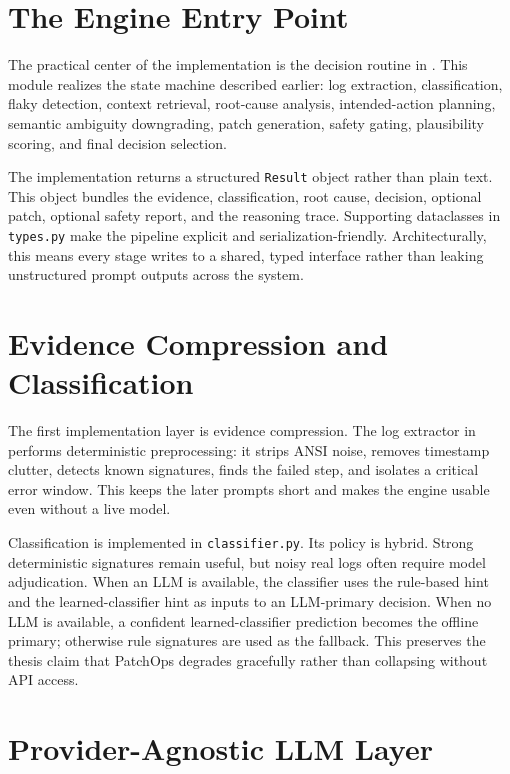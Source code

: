 \section{The Engine Entry Point}

The practical center of the implementation is the decision routine in . This
module realizes the state machine described earlier: log extraction, classification, flaky detection, context
retrieval, root-cause analysis, intended-action planning, semantic ambiguity downgrading, patch generation,
safety gating, plausibility scoring, and final decision selection.

The implementation returns a structured \texttt{Result} object rather than plain text. This object bundles the
evidence, classification, root cause, decision, optional patch, optional safety report, and the reasoning
trace. Supporting dataclasses in \texttt{types.py} make the pipeline explicit and serialization-friendly.
Architecturally, this means every stage writes to a shared, typed interface rather than leaking unstructured
prompt outputs across the system.

\section{Evidence Compression and Classification}

The first implementation layer is evidence compression. The log extractor in
 performs deterministic preprocessing: it strips ANSI noise, removes
timestamp clutter, detects known signatures, finds the failed step, and isolates a critical error window. This
keeps the later prompts short and makes the engine usable even without a live model.

Classification is implemented in \texttt{classifier.py}. Its policy is hybrid. Strong deterministic signatures
remain useful, but noisy real logs often require model adjudication. When an LLM is available, the classifier
uses the rule-based hint and the learned-classifier hint as inputs to an LLM-primary decision. When no LLM is
available, a confident learned-classifier prediction becomes the offline primary; otherwise rule signatures are
used as the fallback. This preserves the thesis claim that PatchOps degrades gracefully rather than collapsing
without API access.

\section{Provider-Agnostic LLM Layer}

